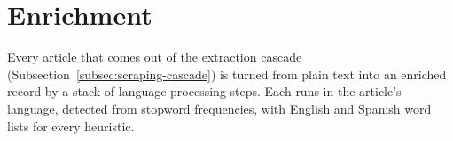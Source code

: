 
\section{Enrichment}
\label{sec:design-enrichment}

Every article that comes out of the extraction cascade
(Subsection~\ref{subsec:scraping-cascade}) is turned from plain text
into an enriched record by a stack of language-processing steps. Each
runs in the article's language, detected from stopword frequencies,
with English and Spanish word lists for every heuristic.

